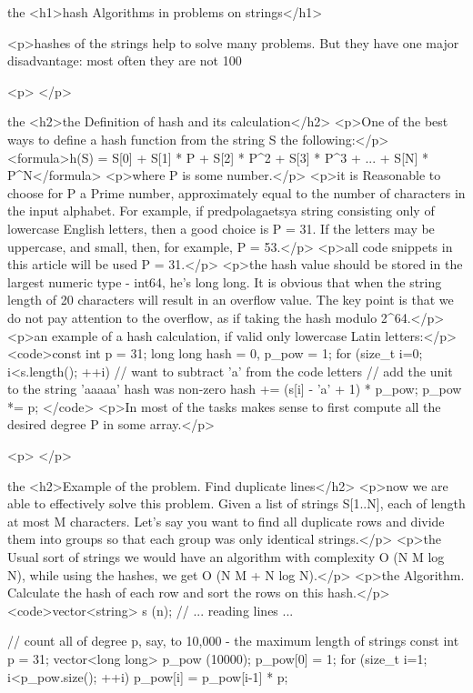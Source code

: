 the <h1>hash Algorithms in problems on strings</h1>

<p>hashes of the strings help to solve many problems. But they have one major disadvantage: most often they are not 100%

<p> </p>

the <h2>the Definition of hash and its calculation</h2>
<p>One of the best ways to define a hash function from the string S the following:</p>
<formula>h(S) = S[0] + S[1] * P + S[2] * P^2 + S[3] * P^3 + ... + S[N] * P^N</formula>
<p>where P is some number.</p>
<p>it is Reasonable to choose for P a Prime number, approximately equal to the number of characters in the input alphabet. For example, if predpolagaetsya string consisting only of lowercase English letters, then a good choice is P = 31. If the letters may be uppercase, and small, then, for example, P = 53.</p>
<p>all code snippets in this article will be used P = 31.</p>
<p>the hash value should be stored in the largest numeric type - int64, he's long long. It is obvious that when the string length of 20 characters will result in an overflow value. The key point is that we do not pay attention to the overflow, as if taking the hash modulo 2^64.</p>
<p>an example of a hash calculation, if valid only lowercase Latin letters:</p>
<code>const int p = 31;
long long hash = 0, p_pow = 1;
for (size_t i=0; i<s.length(); ++i)
{
// want to subtract 'a' from the code letters
// add the unit to the string 'aaaaa' hash was non-zero
hash += (s[i] - 'a' + 1) * p_pow;
p_pow *= p;
}</code>
<p>In most of the tasks makes sense to first compute all the desired degree P in some array.</p>

<p> </p>

the <h2>Example of the problem. Find duplicate lines</h2>
<p>now we are able to effectively solve this problem. Given a list of strings S[1..N], each of length at most M characters. Let's say you want to find all duplicate rows and divide them into groups so that each group was only identical strings.</p>
<p>the Usual sort of strings we would have an algorithm with complexity O (N M log N), while using the hashes, we get O (N M + N log N).</p>
<p>the Algorithm. Calculate the hash of each row and sort the rows on this hash.</p>
<code>vector<string> s (n);
// ... reading lines ...

// count all of degree p, say, to 10,000 - the maximum length of strings
const int p = 31;
vector<long long> p_pow (10000);
p_pow[0] = 1;
for (size_t i=1; i<p_pow.size(); ++i)
p_pow[i] = p_pow[i-1] * p;

